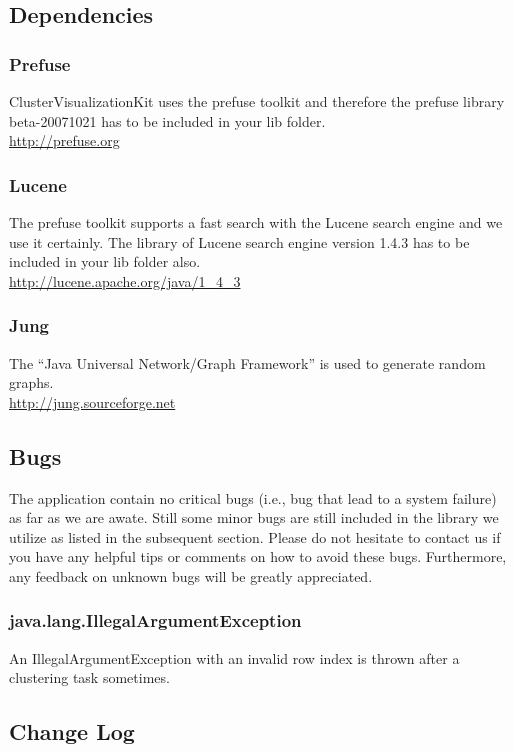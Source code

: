 \documentclass[a4paper, 11pt]{article}
\begin{document}
	\subsection{Dependencies}
		\subsubsection{Prefuse}
			ClusterVisualizationKit uses the prefuse toolkit and therefore the prefuse library beta-20071021 has to be included in your lib folder. \\
			\url{http://prefuse.org}
		
		\subsubsection{Lucene}
			The prefuse toolkit supports a fast search with the Lucene search engine and we use it certainly.
			The library of Lucene search engine version 1.4.3 has to be included in your lib folder also. \\
			\url{http://lucene.apache.org/java/1\_4\_3}
		
		\subsubsection{Jung}
			The ``Java Universal Network/Graph Framework'' is used to generate random graphs.\\
			\url{http://jung.sourceforge.net}
		
		\subsection{Bugs }
			The application contain no critical bugs (i.e., bug that lead to a system failure) as far as we are awate. Still some minor bugs are still included in the library we utilize as listed in the subsequent section. Please do not hesitate to contact us if you have any helpful tips or comments on how to avoid these bugs. Furthermore, any feedback on unknown bugs will be greatly appreciated.

		\subsubsection*{java.lang.IllegalArgumentException}
			An IllegalArgumentException with an invalid row index is thrown after a clustering task sometimes.

\subsection{Change Log}
\end{document}
